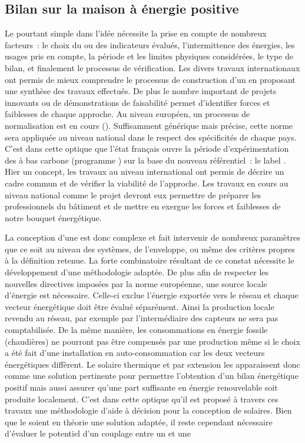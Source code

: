 \subsection{Bilan sur la maison à énergie positive} %
\label{sub:bilan_sur_la_BEPOS}
Le  pourtant simple dans l’idée nécessite la prise en compte de nombreux
facteurs~: le choix du ou des indicateurs évalués, l’intermittence des énergies, les
usages pris en compte, la période et les limites physiques considérées, le type de bilan,
et finalement le processus de vérification. Les divers travaux internationaux ont permis
de mieux comprendre le processus de construction d’un  en proposant une
synthèse des travaux effectués. De plus le nombre important de projets innovants ou de
démonstrations de faisabilité permet d’identifier forces et faiblesses de chaque
approche. Au niveau européen, un processus de normalisation est en cours ().
Suffisamment générique mais précise, cette
norme sera appliquée au niveau national dans le respect des spécificités de chaque pays.
C’est dans cette optique que l’état français ouvre la période d’expérimentation des
 à bas carbone (programme ) sur la base du nouveau référentiel~: le label .
Hier un concept, les travaux au niveau international ont permis de décrire un cadre commun
et de vérifier la viabilité de l’approche. Les travaux en cours au niveau national comme
le projet  devront eux permettre de préparer les professionnels du bâtiment
et de mettre en exergue les forces et faiblesses de notre bouquet énergétique.


La conception d’une  est donc complexe et fait intervenir de nombreux
paramètres que ce soit au niveau des systèmes, de l’enveloppe, ou même des critères
propres à la définition retenue. La forte combinatoire résultant de ce constat nécessite
le développement d’une méthodologie adaptée. De plus afin de respecter les nouvelles
directives imposées par la norme européenne, une source locale d’énergie est nécessaire.
Celle-ci exclue l’énergie exportée vers le réseau et chaque vecteur énergétique doit être
évalué séparément. Ainsi la production locale revendu au réseau, par exemple par
l’intermédiaire des capteurs
 ne sera pas comptabilisée. De la même manière, les consommations en énergie
fossile (chaudières) ne pourront pas être compensés par une production
 même si le choix a été fait d’une installation en
auto-consommation car les deux vecteurs énergétiques diffèrent. Le solaire thermique et
par extension les  apparaissent donc comme une solution pertinente pour permettre
l’obtention d’un bilan énergétique positif mais aussi assurer qu’une part suffisante en
énergie renouvelable soit produite localement. C’est dans cette optique qu’il est proposé
à travers ces travaux une méthodologie d’aide à décision pour la conception de 
solaires. Bien que le  soient en théorie une solution adaptée, il reste cependant
nécessaire d’évaluer le potentiel d’un couplage entre un  et une 

